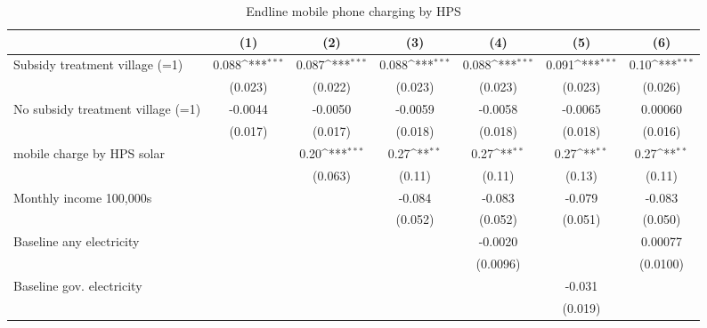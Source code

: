 \begin{table}[htbp]\centering
\def\sym#1{\ifmmode^{#1}\else\(^{#1}\)\fi}
\caption{Endline mobile phone charging by HPS}
\begin{tabular*}{1\hsize}{@{\hskip\tabcolsep\extracolsep\fill}l*{6}{c}}
\toprule
                &\multicolumn{1}{c}{(1)}         &\multicolumn{1}{c}{(2)}         &\multicolumn{1}{c}{(3)}         &\multicolumn{1}{c}{(4)}         &\multicolumn{1}{c}{(5)}         &\multicolumn{1}{c}{(6)}         \\
\midrule
Subsidy treatment village (=1)&    0.088\sym{***}&    0.087\sym{***}&    0.088\sym{***}&    0.088\sym{***}&    0.091\sym{***}&     0.10\sym{***}\\
                &  (0.023)         &  (0.022)         &  (0.023)         &  (0.023)         &  (0.023)         &  (0.026)         \\
No subsidy treatment village (=1)&  -0.0044         &  -0.0050         &  -0.0059         &  -0.0058         &  -0.0065         &  0.00060         \\
                &  (0.017)         &  (0.017)         &  (0.018)         &  (0.018)         &  (0.018)         &  (0.016)         \\
mobile charge by HPS solar&                  &     0.20\sym{***}&     0.27\sym{**} &     0.27\sym{**} &     0.27\sym{**} &     0.27\sym{**} \\
                &                  &  (0.063)         &   (0.11)         &   (0.11)         &   (0.13)         &   (0.11)         \\
Monthly income 100,000s&                  &                  &   -0.084         &   -0.083         &   -0.079         &   -0.083         \\
                &                  &                  &  (0.052)         &  (0.052)         &  (0.051)         &  (0.050)         \\
Baseline any electricity&                  &                  &                  &  -0.0020         &                  &  0.00077         \\
                &                  &                  &                  & (0.0096)         &                  & (0.0100)         \\
Baseline gov. electricity&                  &                  &                  &                  &   -0.031         &                  \\
                &                  &                  &                  &                  &  (0.019)         &                  \\

\end{tabular*}
\end{table}
